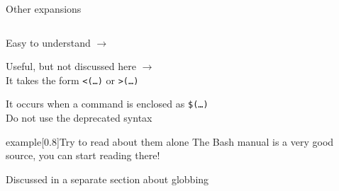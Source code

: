 \begin{frame}{Other expansions}
    \vspace{-12mm}
    \begin{columns}
        \begin{column}{\dimexpr\paperwidth-10mm}
            \begin{center}
                \large{}
            \end{center}
            \begin{description}
                \setlength{\itemsep}{3mm}
                \item[Tilde expansion:]
                    Easy to understand $\to$ 
                \item[Process substitution:]
                    Useful, but not discussed here $\to$ \\
                    It takes the form \alert{\texttt{<(\ldots)}} or \alert{\texttt{>(\ldots)}}
                \item[Command substitution:]
                    It occurs when a command is enclosed as \alert{\texttt{\$(\ldots)}}\\
                    Do not use the deprecated syntax 
            \end{description}
            \vspace{-2mm}
            \begin{varblock}{example}[0.8\textwidth]{Try to read about them alone}
                The Bash manual is a very good source, you can start reading there!\\
            \end{varblock}
            \begin{center}
                \large{}
            \end{center}
            \begin{description}[\hspace{0.4\textwidth}]
                \item[Filename expansion:]
                    Discussed in a separate section about globbing
            \end{description}
        \end{column}
    \end{columns}
\end{frame}
